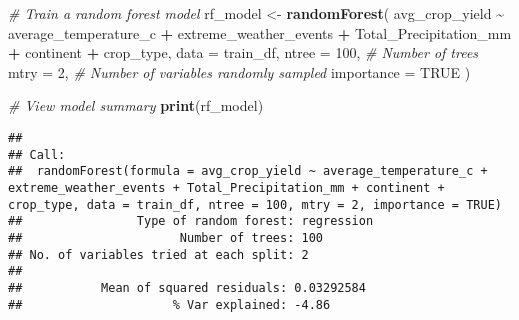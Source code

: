 \documentclass[
]{article}
\newenvironment{Shaded}{\begin{snugshade}}{\end{snugshade}}
\newcommand{\AttributeTok}[1]{\textcolor[rgb]{0.13,0.29,0.53}{#1}}
\newcommand{\CommentTok}[1]{\textcolor[rgb]{0.56,0.35,0.01}{\textit{#1}}}
\newcommand{\ConstantTok}[1]{\textcolor[rgb]{0.56,0.35,0.01}{#1}}
\newcommand{\DecValTok}[1]{\textcolor[rgb]{0.00,0.00,0.81}{#1}}
\newcommand{\FunctionTok}[1]{\textcolor[rgb]{0.13,0.29,0.53}{\textbf{#1}}}
\newcommand{\NormalTok}[1]{#1}
\newcommand{\OtherTok}[1]{\textcolor[rgb]{0.56,0.35,0.01}{#1}}
\newcommand{\SpecialCharTok}[1]{\textcolor[rgb]{0.81,0.36,0.00}{\textbf{#1}}}
\begin{document}
\begin{Shaded}
\begin{Highlighting}[]
\CommentTok{\# Train a random forest model}
\NormalTok{rf\_model }\OtherTok{\textless{}{-}} \FunctionTok{randomForest}\NormalTok{(}
\NormalTok{  avg\_crop\_yield }\SpecialCharTok{\textasciitilde{}}\NormalTok{ average\_temperature\_c }\SpecialCharTok{+}\NormalTok{ extreme\_weather\_events }\SpecialCharTok{+} 
\NormalTok{    Total\_Precipitation\_mm }\SpecialCharTok{+}\NormalTok{ continent }\SpecialCharTok{+}\NormalTok{ crop\_type,}
  \AttributeTok{data =}\NormalTok{ train\_df,}
  \AttributeTok{ntree =} \DecValTok{100}\NormalTok{, }\CommentTok{\# Number of trees}
  \AttributeTok{mtry =} \DecValTok{2}\NormalTok{,    }\CommentTok{\# Number of variables randomly sampled}
  \AttributeTok{importance =} \ConstantTok{TRUE}
\NormalTok{)}

\CommentTok{\# View model summary}
\FunctionTok{print}\NormalTok{(rf\_model)}
\end{Highlighting}
\end{Shaded}

\begin{verbatim}
## 
## Call:
##  randomForest(formula = avg_crop_yield ~ average_temperature_c +      extreme_weather_events + Total_Precipitation_mm + continent +      crop_type, data = train_df, ntree = 100, mtry = 2, importance = TRUE) 
##                Type of random forest: regression
##                      Number of trees: 100
## No. of variables tried at each split: 2
## 
##           Mean of squared residuals: 0.03292584
##                     % Var explained: -4.86
\end{verbatim}
\end{document}
